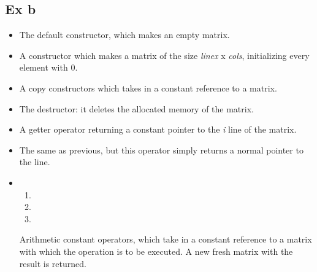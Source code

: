 \documentclass{article}
\begin{document}
			\pagebreak

		\subsection{Ex b}
			

			\begin{itemize}
				\item {}
					\par The default constructor, which makes an empty matrix.

				\item {}
					\par A constructor which makes a matrix of the size \textit{linex} x \textit{cols}, initializing every element with 0.

				\item {}
					\par A copy constructors which takes in a constant reference to a matrix.

				\item {}
					\par The destructor: it deletes the allocated memory of the matrix.

				\item {}
					\par A getter operator returning a constant pointer to the \textit{i} line of the matrix.

				\item {}
					\par The same as previous, but this operator simply returns a normal pointer to the line.

				\item
					\begin{enumerate}
						\item {}

						\item {}

						\item {}
					\end{enumerate}
					Arithmetic constant operators, which take in a constant reference to a matrix with which the operation is to be executed. A new fresh matrix with the result is returned.


\end{itemize}
\end{document}

